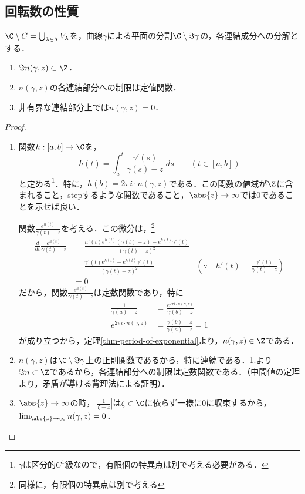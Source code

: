 \documentclass[uplatex, dvipdfmx]{jsreport}
\begin{document}
\subsection{回転数の性質}

\begin{lemma}\label{lemma-character-of-winding-number}
    $\C\setminus C=\bigcup_{\lambda\in\Lambda}V_\lambda$を，曲線$\gamma$による平面の分割$\C\setminus\Im\gamma$の，各連結成分への分解とする．
    \begin{enumerate}
        \item $\Im n(\gamma,z)\subset\Z$．
        \item $n(\gamma,z)$の各連結部分への制限は定値関数．
        \item 非有界な連結部分上では$n(\gamma,z)=0$．
    \end{enumerate}
\end{lemma}
\begin{proof}\mbox{}
    \begin{enumerate}
        \item 
    関数$h:[a,b]\to\C$を，
    \[h(t)=\int^t_a\frac{\gamma'(s)}{\gamma(s)-z}\;ds\qquad(t\in[a,b])\]
    と定める\footnote{$\gamma$は区分的$C^1$級なので，有限個の特異点は別で考える必要がある．}．特に，$h(b)=2\pi i\cdot n(\gamma,z)$である．この関数の値域が$\Z$に含まれること，stepするような関数であること，$\abs{z}\to\infty$では$0$であることを示せば良い．

    関数$\frac{e^{h(t)}}{\gamma(t)-z}$を考える．この微分は，\footnote{同様に，有限個の特異点は別で考える}
    \begin{align*}
        \frac{d}{dt}\frac{e^{h(t)}}{\gamma(t)-z}
        &=\frac{h'(t)e^{h(t)}(\gamma(t)-z)-e^{h(t)}\gamma'(t)}{(\gamma(t)-z)^2}\\
        &=\frac{\gamma'(t)e^{h(t)}-e^{h(t)}\gamma'(t)}{(\gamma(t)-z)^2}&\left(\because\quad h'(t)=\frac{\gamma'(t)}{\gamma(t)-z}\right)\\
        &=0
    \end{align*}
    だから，関数$\frac{e^{h(t)}}{\gamma(t)-z}$は定数関数であり，特に
    \begin{align*}
        \frac{1}{\gamma(a)-z}&=\frac{e^{2\pi i\cdot n(\gamma,z)}}{\gamma(b)-z}\\
        e^{2\pi i\cdot n(\gamma,z)}&=\frac{\gamma(b)-z}{\gamma(a)-z}=1
    \end{align*}
    が成り立つから，定理\ref{thm-period-of-exponential}より，$n(\gamma,z)\in\Z$である．
    \item $n(\gamma,z)$は$\C\setminus\Im\gamma$上の正則関数であるから，特に連続である．1.より$\Im n\subset\Z$であるから，各連結部分への制限は定数関数である．（中間値の定理より，矛盾が導ける背理法による証明）．
    \item $\abs{z}\to\infty$の時，$\left|\frac{1}{\zeta-z}\right|$は$\zeta\in\C$に依らず一様に$0$に収束するから，$\lim_{\abs{z}\to\infty}n(\gamma,z)=0$．
    \end{enumerate}
\end{proof}
\end{document}
